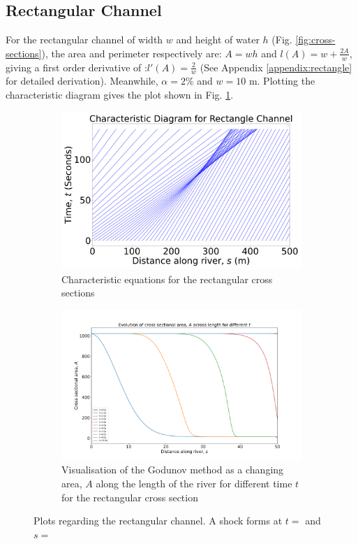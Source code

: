 \documentclass[12pt]{article}
\begin{document}
\subsection{Rectangular Channel}
For the rectangular channel of width $w$ and height of water $h$ (Fig. \ref{fig:cross-sections}), the area and perimeter respectively are: $A = wh$ and $l(A) = w + \frac{2A}{w}$, giving a first order derivative of :$l'(A) = \frac{2}{w}$ (See Appendix \ref{appendix:rectangle} for detailed derivation). Meanwhile, $\alpha = 2\%$ and $w = 10\text{ m}$. Plotting the characteristic diagram gives the plot shown in Fig. \ref{fig:rect_char}.
\begin{figure}[ht]
    \centering
    \begin{subfigure}[b]{0.49\textwidth}
        \centering
        \includegraphics[width=\textwidth]{Figures/Rectangle_characteristic.pdf}
        \caption{Characteristic equations for the rectangular cross sections}
        \label{fig:rect_char}
    \end{subfigure}
    \hfill
    \begin{subfigure}[b]{0.49\textwidth}
        \centering
        \includegraphics[width=\textwidth]{Figures/Rectangle_godunov_rk45.pdf}
        \caption{Visualisation of the Godunov method as a changing area, $A$ along the length of the river for different time $t$ for the rectangular cross section}
        \label{fig:rect_godunov}
    \end{subfigure}
    \caption{Plots regarding the rectangular channel. A shock forms at $t = $ and $s = $}
\end{figure}
\end{document}
